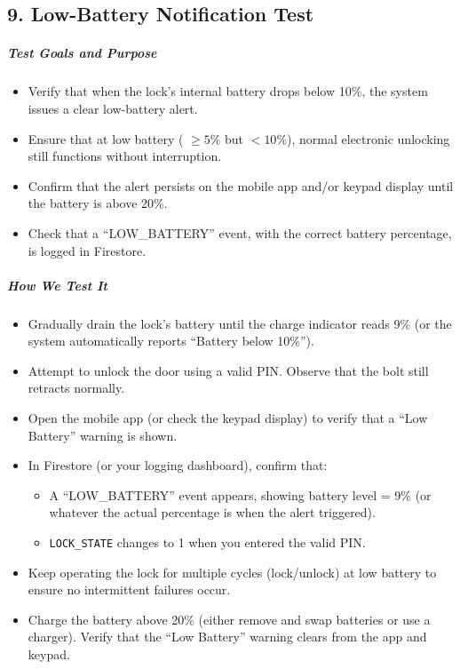 \newpage
\begin{samepage}
\subsection*{9. Low-Battery Notification Test}

\subparagraph{Test Goals and Purpose}
\begin{itemize}
    \item Verify that when the lock’s internal battery drops below 10\%, the system issues a clear low-battery alert.
    \item Ensure that at low battery ( \(\ge 5\%\) but $<10\%$), normal electronic unlocking still functions without interruption.
    \item Confirm that the alert persists on the mobile app and/or keypad display until the battery is above 20\%.
    \item Check that a “LOW\_BATTERY” event, with the correct battery percentage, is logged in Firestore.
\end{itemize}

\subparagraph{How We Test It}
\begin{itemize}
    \item Gradually drain the lock’s battery until the charge indicator reads 9\% (or the system automatically reports “Battery below 10\%”).
    \item Attempt to unlock the door using a valid PIN. Observe that the bolt still retracts normally.
    \item Open the mobile app (or check the keypad display) to verify that a “Low Battery” warning is shown.
    \item In Firestore (or your logging dashboard), confirm that:
    \begin{itemize}
        \item A “LOW\_BATTERY” event appears, showing battery level = 9\% (or whatever the actual percentage is when the alert triggered).
        \item \texttt{LOCK\_STATE} changes to 1 when you entered the valid PIN.
    \end{itemize}
    \item Keep operating the lock for multiple cycles (lock/unlock) at low battery to ensure no intermittent failures occur.
    \item Charge the battery above 20\% (either remove and swap batteries or use a charger). Verify that the “Low Battery” warning clears from the app and keypad.
\end{itemize}
\end{samepage}


